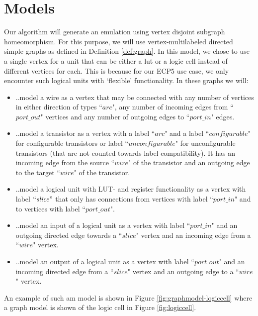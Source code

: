 \chapter{Models}
\label{sec:models}
Our algorithm will generate an emulation using vertex disjoint subgraph homeomorphism. For this purpose, we will use vertex-multilabeled directed simple graphs as defined in Definition \ref{def:graph}. In this model, we chose to use a single vertex for a unit that can be either a lut or a logic cell instead of different vertices for each. This is because for our ECP5 use case, we only encounter such logical units with `flexible' functionality. In these graphs we will:

\begin{itemize}
\item ..model a wire as a vertex that may be connected with any number of vertices in either direction of types ``$\mathit{arc}$", any number of incoming edges from ``$\mathit{port\_out}$" vertices and any number of outgoing edges to ``$\mathit{port\_in}$" edges.
\item ..model a transistor as a vertex with a label ``$\mathit{arc}$" and a label ``$\mathit{configurable}$" for configurable transistors or label ``$\mathit{unconfigurable}$" for unconfigurable transistors (that are not counted towards label compatibility). It has an incoming edge from the source ``$\mathit{wire}$" of the transistor and an outgoing edge to the target ``$\mathit{wire}$" of the transistor.
\item ..model a logical unit with LUT- and register functionality as a vertex with label $``\mathit{slice}"$ that only has connections from vertices with label ``$\mathit{port\_in}$" and to vertices with label ``$\mathit{port\_out}$".
\item ..model an input of a logical unit as a vertex with label ``$\mathit{port\_in}$" and an outgoing directed edge towards a ``$\mathit{slice}$" vertex and an incoming edge from a ``$\mathit{wire}$" vertex.
\item ..model an output of a logical unit as a vertex with label ``$\mathit{port\_out}$" and an incoming directed edge from a ``$\mathit{slice}$" vertex and an outgoing edge to a ``$\mathit{wire}$" vertex.
\end{itemize}

An example of such am model is shown in Figure \ref{fig:graphmodel-logiccell} where a graph model is shown of the logic cell in Figure \ref{fig:logiccell}.

